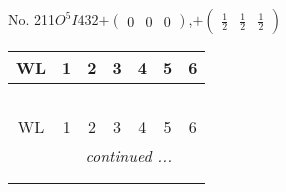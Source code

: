 \documentclass[fleqn,9pt,landscape]{jsarticle}
\begin{document}
\newpage
No. 211\quad$O_{}^{5}$\quad$I432$\quad[ cubic ]\quad$+\begin{pmatrix} 0 & 0 & 0 \end{pmatrix}$,\quad $+\begin{pmatrix} \frac{1}{2} & \frac{1}{2} & \frac{1}{2} \end{pmatrix}$
\begin{center}
\renewcommand{\arraystretch}{1.2}
\begin{longtable}{ccccccc}
 \hline \hline
WL & 1 & 2 & 3 & 4 & 5 & 6 \\ \hline \endfirsthead

\multicolumn{6}{l}{\tablename\ \thetable{}} \\
 \hline \hline
WL & 1 & 2 & 3 & 4 & 5 & 6 \\ \hline \endhead

 \hline \hline
\multicolumn{6}{r}{\footnotesize\it continued ...} \\ \endfoot

 \hline \hline
\multicolumn{6}{r}{} \\ \endlastfoot


\end{longtable}
\end{center}
\end{document}
